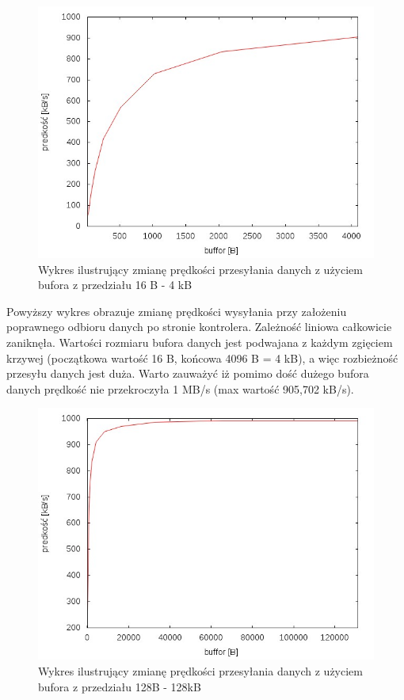 \documentclass{BscUS}
\begin{document}
\begin{figure}[H]
{
\centering
\includegraphics[width=1\textwidth]{./img/S_bbuf1}
\caption{Wykres ilustrujący zmianę prędkości przesyłania danych z użyciem bufora z przedziału 16 B - 4 kB}
\label{fig:S_bbuf1}
}
\end{figure}
\noindent Powyższy wykres obrazuje zmianę prędkości wysyłania przy założeniu poprawnego odbioru danych po stronie kontrolera. Zależność liniowa całkowicie zaniknęła. Wartości rozmiaru bufora danych jest podwajana z każdym zgięciem krzywej (początkowa wartość 16 B, końcowa 4096 B = 4 kB), a więc rozbieżność przesyłu danych jest duża. Warto zauważyć iż pomimo dość dużego bufora danych prędkość nie przekroczyła 1 MB/s (max wartość 905,702 kB/s).
\begin{figure}[H]
{
\centering
\includegraphics[width=1\textwidth]{./img/S_bbuf2}
\caption{Wykres ilustrujący zmianę prędkości przesyłania danych z użyciem bufora z przedziału 128B - 128kB}
\label{fig:S_bbuf2}
}
\end{figure}
\end{document}
